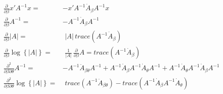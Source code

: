 \documentclass{article}
\newcommand\mb{}
\newcommand\mr{}
\newcommand\bA{A}
\begin{document}
\begin{align*}
   \frac{\partial}{\partial\beta} \mb{x}'\bA^{-1}\mb{x} =&
      -\mb{x}'\bA^{-1}\dot{\bA}_\beta\bA^{-1}\mb{x} \\
   \frac{\partial}{\partial\beta}\bA^{-1} =&
      -\bA^{-1}\dot{\bA}_\beta\bA^{-1}  \\
   \frac{\partial}{\partial \beta} |\bA| = &
       \,\,|\bA| \,\mr{trace}\left( \bA^{-1}\dot{\bA}_\beta \right) \\
   \frac{\partial}{\partial \beta} \log\left\{|\bA|\right\} =&
       \,\,\frac{1}{|\bA|}\, \frac{\partial}{\partial\beta}\bA =
       \mr{trace}\left( \bA^{-1}\dot{\bA}_\beta \right) \\
   \frac{\partial^2}{\partial\beta\partial\theta} \bA^{-1} =&
       -\bA^{-1}\ddot{\bA}_{\beta\theta}\bA^{-1} +
        \bA^{-1}\dot{\bA}_\beta \bA^{-1}\dot{\bA}_\theta\bA^{-1} +
        \bA^{-1}\dot{\bA}_\theta\bA^{-1}\dot{\bA}_\beta \bA^{-1} \\
   \frac{\partial^2}{\partial\beta\partial\theta} \log\left\{|\bA|\right\} =&
        \,\,\mr{trace}\left(\bA^{-1}\ddot{\bA}_{\beta\theta} \right)  -
        \mr{trace}\left(\bA^{-1}\dot{\bA}_\beta\bA^{-1}\dot{\bA}_\theta\right)
\end{align*}
\end{document}
